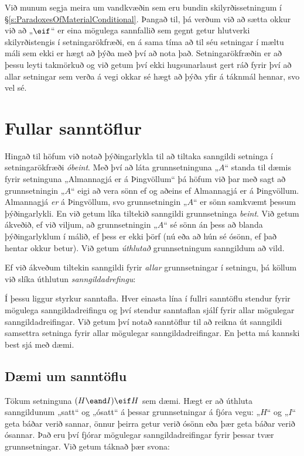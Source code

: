 Við munum segja meira um vandkvæðin sem eru bundin skilyrðissetningum í \S\ref{s:ParadoxesOfMaterialConditional}. Þangað til, þá verðum við að sætta okkur við að „$\eif$“ er eina mögulega sannfallið sem gegnt getur hlutverki skilyrðistengis í setningarökfræði, en á sama tíma að til séu setningar í mæltu máli sem ekki er hægt að þýða með því að nota það. Setningarökfræðin er að þessu leyti takmörkuð og við getum því ekki hugsunarlaust gert ráð fyrir því að allar setningar sem verða á vegi okkar sé hægt að þýða yfir á táknmál hennar, svo vel sé.

\chapter{Fullar sanntöflur}\label{s:CompleteTruthTables}

Hingað til höfum við notað þýðingarlykla til að tiltaka sanngildi setninga í setningarökfræði \emph{óbeint}. Með því að láta grunnsetninguna „$A$“ standa til dæmis fyrir setninguna „Almannagjá er á Þingvöllum“ þá höfum við þar með sagt að grunnsetningin „$A$“ eigi að vera sönn ef og aðeins ef Almannagjá er á Þingvöllum. Almannagjá \emph{er} á Þingvöllum, svo grunnsetningin „$A$“ er sönn samkvæmt þessum þýðingarlykli. En við getum líka tiltekið sanngildi grunnsetninga \emph{beint}. Við getum ákveðið, ef við viljum, að grunnsetningin „$A$“ sé sönn án þess að blanda þýðingarlyklum í málið, ef þess er ekki þörf (nú eða að hún sé ósönn, ef það hentar okkur betur). Við getum \emph{úthlutað} grunnsetningum sanngildum að vild.

Ef við ákveðum tiltekin sanngildi fyrir \emph{allar} grunnsetningar í setningu, þá köllum við slíka úthlutun \emph{sanngildadrefingu}:
	
Í þessu liggur styrkur sanntafla. Hver einasta lína í fullri sanntöflu stendur fyrir mögulega sanngildadreifingu og því stendur sanntaflan sjálf fyrir allar mögulegar sanngildadreifingar. Við getum því notað sanntöflur til að reikna út sanngildi samsettra setninga fyrir allar mögulegar sanngildadreifingar. En þetta má kannski best sjá með dæmi.	
	
\section{Dæmi um sanntöflu}

Tökum setninguna $(H\eand I)\eif H$ sem dæmi. Hægt er að úthluta sanngildunum „satt“ og „ósatt“ á þessar grunnsetningar á fjóra vegu: „$H$“ og „$I$“ geta báðar verið sannar, önnur þeirra getur verið ósönn eða þær geta báðar verið ósannar. Það eru því fjórar mögulegar sanngildadreifingar fyrir þessar tvær grunnsetningar. Við getum táknað þær svona:

